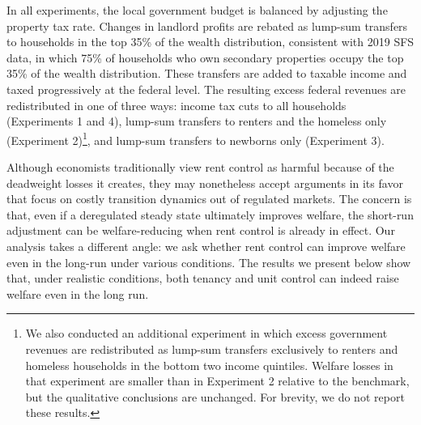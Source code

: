 \documentclass[parskip=full]{article}
\begin{document}
In all experiments, the local government budget is balanced by adjusting the property tax rate. Changes in landlord profits are rebated as lump-sum transfers to households in the top 35\% of the wealth distribution, consistent with 2019 SFS data, in which 75\% of households who own secondary properties occupy the top 35\% of the wealth distribution. These transfers are added to taxable income and taxed progressively at the federal level. The resulting excess federal revenues are redistributed in one of three ways: income tax cuts to all households (Experiments 1 and 4), lump-sum transfers to renters and the homeless only (Experiment 2)\footnote{We also conducted an additional experiment in which excess government revenues are redistributed as lump-sum transfers exclusively to renters and homeless households in the bottom two income quintiles. Welfare losses in that experiment are smaller than in Experiment 2 relative to the benchmark, but the qualitative conclusions are unchanged. For brevity, we do not report these results.}, and lump-sum transfers to newborns only (Experiment 3).

Although economists traditionally view rent control as harmful because of the deadweight losses it creates, they may nonetheless accept arguments in its favor that focus on costly transition dynamics out of regulated markets. The concern is that, even if a deregulated steady state ultimately improves welfare, the short-run adjustment can be welfare-reducing \citep{fmn-2023} when rent control is already in effect. Our analysis takes a different angle: we ask whether rent control can improve welfare even in the long-run under various conditions. The results we present below show that, under realistic conditions, both tenancy and unit control can indeed raise welfare even in the long run.
\end{document}
